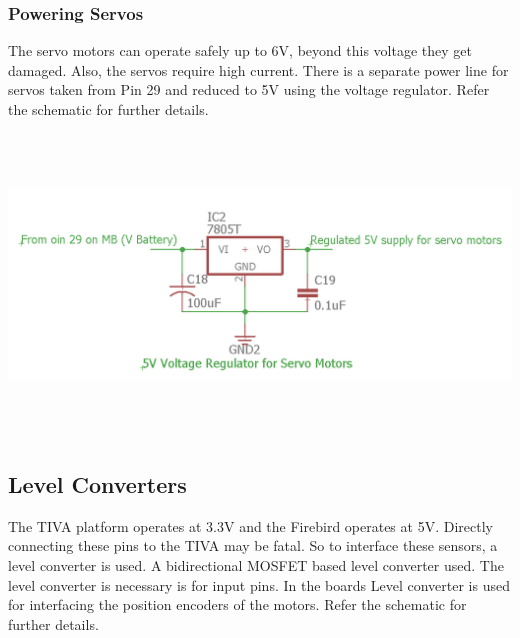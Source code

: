 \documentclass[a4paper,10pt,oneside]{article}
\begin{document}
{	\subsubsection{\Large \textbf{Powering Servos}}
	{The servo motors can operate safely up to 6V, beyond this voltage they get damaged. Also, the servos require high current. There is a separate power line for servos taken from Pin 29 and reduced to 5V using the voltage regulator. Refer the schematic for further details.\\ }
		
	\includegraphics[width=18cm, height=8cm]{ServoPowerSupply}\\			
	\subsection{\huge \textbf{Level Converters}}
	{The TIVA platform operates at 3.3V and the Firebird operates at 5V. Directly connecting these pins to the TIVA may be fatal. So to interface these sensors, a level converter is used. A bidirectional MOSFET based level converter used. The level converter is necessary is for input pins. In the boards Level converter is used for interfacing the position encoders of the motors. Refer the schematic for further details.\\ }
		
}
\end{document}
